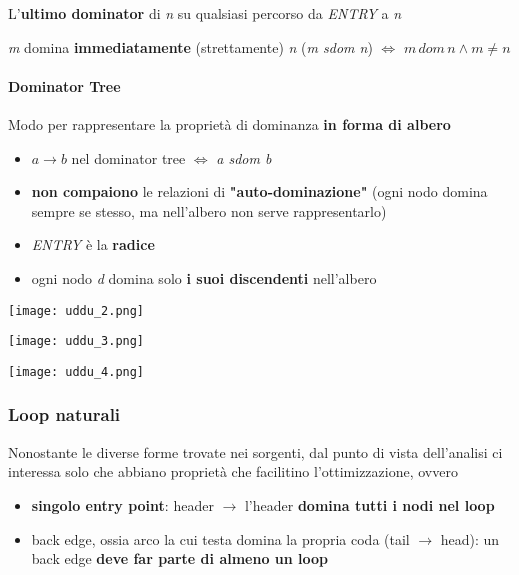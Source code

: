 L'\textbf{ultimo dominator} di \textit{n} su qualsiasi percorso da \textit{ENTRY} a \textit{n}

\textit{m} domina \textbf{immediatamente} (strettamente) \textit{n} (\textit{m sdom n}) $\iff$ $m\, dom \,n\land m \neq n$

\paragraph{Dominator Tree}

Modo per rappresentare la propriet\`a di dominanza \textbf{in forma di albero}

\begin{itemize}
  \item $a \rightarrow b$ nel dominator tree $\iff$ \textit{a sdom b}
  \item \textbf{non compaiono} le relazioni di \textbf{"auto-dominazione"} (ogni nodo domina sempre se stesso, ma nell'albero non serve rappresentarlo)
  \item \textit{ENTRY} \`e la \textbf{radice}
  \item ogni nodo \textit{d} domina solo \textbf{i suoi discendenti} nell'albero
\end{itemize}

\begin{example}[frametitle={Esempi di DT}]
  \begin{minipage}[c]{.24\textwidth}
    \texttt{[image: uddu\_2.png]}
  \end{minipage}
  \begin{minipage}[c]{.24\textwidth}
    \texttt{[image: uddu\_3.png]}
  \end{minipage}\hfill\vline\hfill
  \begin{minipage}[c]{.48\textwidth}
    \texttt{[image: uddu\_4.png]}
    \label{example-dt}
  \end{minipage}
\end{example}


\subsubsection{Loop naturali}

Nonostante le diverse forme trovate nei sorgenti, dal punto di vista dell'analisi ci interessa solo che abbiano propriet\`a che facilitino l'ottimizzazione, ovvero
\begin{itemize}
  \item \textbf{singolo entry point}: header $\rightarrow$ l'header \textbf{domina tutti i nodi nel loop}
  \item back edge, ossia arco la cui testa domina la propria coda (tail $\rightarrow$ head): un back edge \textbf{deve far parte di almeno un loop}
\end{itemize}

